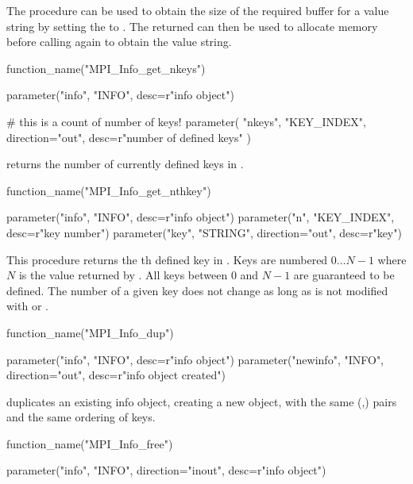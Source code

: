 \begin{users}
The  procedure can be used to obtain the size of
the required buffer for a value string by setting the  to . The returned
 can then be used to allocate memory before calling
 again to obtain the value string.
\end{users}

%
\begin{mpi-binding}
    function_name("MPI_Info_get_nkeys")
    
    parameter("info", "INFO", desc=r"info object")
    
    # this is a count of number of keys!
    parameter(
        "nkeys", "KEY_INDEX", direction="out", desc=r"number of defined keys"
    )
\end{mpi-binding}

 returns the number of currently defined keys in .


%
\begin{mpi-binding}
    function_name("MPI_Info_get_nthkey")
    
    parameter("info", "INFO", desc=r"info object")
    parameter("n", "KEY_INDEX", desc=r"key number")
    parameter("key", "STRING", direction="out", desc=r"key")
\end{mpi-binding}

This procedure returns the th defined key in .
Keys are numbered $0 \ldots N-1$ where $N$ is the
value returned by . 
All keys between $0$ and $N-1$ are guaranteed to 
be defined. The number of a given key does not change
as long as  is not modified with 
 or .


%
\begin{mpi-binding}
    function_name("MPI_Info_dup")
    
    parameter("info", "INFO", desc=r"info object")
    parameter("newinfo", "INFO", direction="out", desc=r"info object created")
\end{mpi-binding}

 duplicates an existing info object, creating a new
object, with the same (,) pairs and the same ordering of keys.

%
\begin{mpi-binding}
    function_name("MPI_Info_free")
    
    parameter("info", "INFO", direction="inout", desc=r"info object")
\end{mpi-binding}

